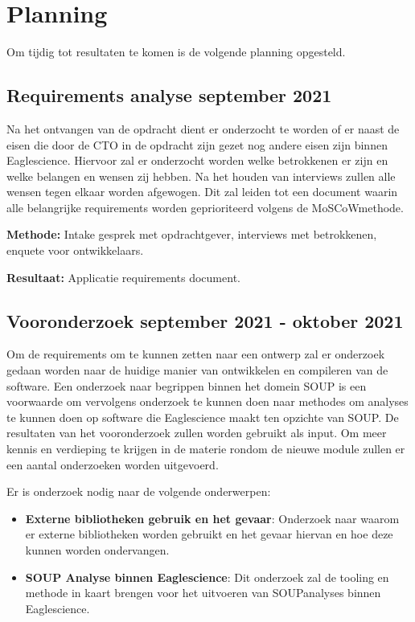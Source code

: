 \section{Planning}\label{sec:planning}
Om tijdig tot resultaten te komen is de volgende planning opgesteld.

\subsection{Requirements analyse \textbf{september 2021}}\label{subsec:requirements-analyse}
Na het ontvangen van de opdracht dient er onderzocht te worden of er naast de eisen die door de CTO in de opdracht zijn gezet nog andere eisen zijn binnen Eaglescience. Hiervoor zal er onderzocht worden welke betrokkenen er zijn en welke belangen en wensen zij hebben. Na het houden van interviews zullen alle wensen tegen elkaar worden afgewogen. Dit zal leiden tot een document waarin alle belangrijke requirements worden geprioriteerd volgens de MoSCoW\-methode.

\textbf{Methode:} Intake gesprek met opdrachtgever, interviews met betrokkenen, enquete voor ontwikkelaars.

\textbf{Resultaat:} Applicatie requirements document.

\subsection{Vooronderzoek \textbf{september 2021 - oktober 2021 }}\label{subsec:onderzoek}
Om de requirements om te kunnen zetten naar een ontwerp zal er onderzoek gedaan worden naar de huidige manier van ontwikkelen en compileren van de software. Een onderzoek naar begrippen binnen het domein SOUP is een voorwaarde om vervolgens onderzoek te kunnen doen naar methodes om analyses te kunnen doen op software die Eaglescience maakt ten opzichte van SOUP. De resultaten van het vooronderzoek zullen worden gebruikt als input.
Om meer kennis en verdieping te krijgen in de materie rondom de nieuwe module zullen er een aantal onderzoeken worden uitgevoerd.


Er is onderzoek nodig naar de volgende onderwerpen:
\begin{itemize}
    \item \textbf{Externe bibliotheken gebruik en het gevaar}: Onderzoek naar waarom er externe bibliotheken worden gebruikt en het gevaar hiervan en hoe deze kunnen worden ondervangen.
    \item \textbf{SOUP Analyse binnen Eaglescience}: Dit onderzoek zal de tooling en methode in kaart brengen voor het uitvoeren van SOUP\-analyses binnen Eaglescience.
\end{itemize}

